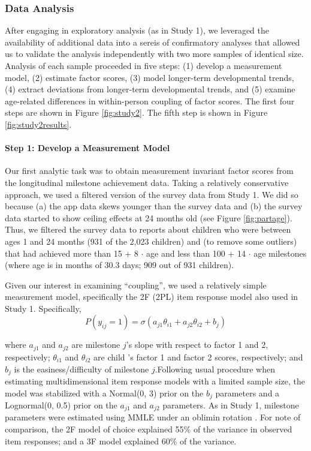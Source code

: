 \documentclass[man, floatsintext]{apa7}
\begin{document}
\subsubsection{Data Analysis}

After engaging in exploratory analysis (as in Study 1), we leveraged the availability of additional data into a sereis of confirmatory analyses that allowed us to validate the analysis independently with two more samples of identical size. Analysis of each sample proceeded in five steps: (1) develop a measurement model, (2) estimate
factor scores, (3) model longer-term developmental trends, (4) extract
deviations from longer-term developmental trends, and (5) examine
age-related differences in within-person coupling of factor scores. The
first four steps are shown in Figure \ref{fig:study2}. The fifth step is
shown in Figure \ref{fig:study2results}.

\paragraph{Step 1: Develop a Measurement
Model}
Our first analytic task was to obtain measurement invariant factor
scores from the longitudinal milestone achievement data. Taking a
relatively conservative approach, we used a filtered version of the
survey data from Study 1. We did so because (a) the app data skews younger than the
survey data and (b) the survey data started to show ceiling effects at
24 months old (see Figure \ref{fig:partage}). Thus, we filtered
the survey data to reports about children who were between ages 1 and 24 months (931 of the
2,023 children) and (to remove some outliers) that had achieved more than 15 + 8 $\cdot$ age and less
than 100 + 14 $\cdot$ age milestones (where age is in months of 30.3 days; 909
out of 931 children). 

Given our interest in examining ``coupling'', we used a relatively simple measurement model, specifically the 2F (2PL) item response model also used in Study 1. Specifically, 
\begin{equation}
P(y_{ij} = 1) = \sigma(a_{j1}\theta_{i1} + a_{j2}\theta_{i2} + b_j)
\end{equation} 

\noindent where $a_{j1}$ and $a_{j2}$ are milestone $j$'s
slope with respect to factor 1 and 2, respectively; $\theta_{i1}$ and
$\theta_{i2}$ are child 's factor 1 and factor 2 scores, respectively;
and $b_j$ is the easiness/difficulty of milestone $j$.Following usual procedure when estimating
multidimensional item response models with a limited sample size, the model was stabilized with a Normal(0, 3)
prior on the $b_j$ parameters and a Lognormal(0, 0.5) prior on the $a_{j1}$ and
$a_{j2}$ parameters. As in Study 1, milestone
parameters were estimated using MMLE under an oblimin rotation \parencite{jennrich1966}. For note of comparison, the 2F model of choice explained 55\% of the variance in observed item responses; and a 3F model explained 60\% of the variance. 
\end{document}
